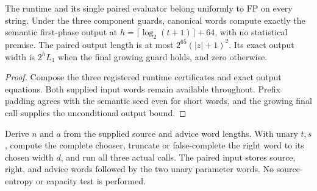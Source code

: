 \begin{theorem}
  \label{thm:lowerbounds-algebraic-affine-phase-one-program}
  \leanok
  The runtime and its single paired evaluator belong uniformly to
  $\mathrm{FP}$ on every string. Under the three component guards,
  canonical words compute exactly the semantic first-phase output at
  $h=\lceil\log_2(t+1)\rceil+64$, with no statistical premise.
  The paired output length is at most $2^{65}(|z|+1)^2$.
  Its exact output width is $2^hL_1$ when the final growing guard
  holds, and zero otherwise.
\end{theorem}
\begin{proof}
  \leanok
  Compose the three registered runtime certificates and exact output
  equations. Both supplied input words remain available throughout.
  Prefix padding agrees with the semantic seed even for short words,
  and the growing final call supplies the unconditional output bound.
\end{proof}

\begin{definition}
  \label{def:lowerbounds-algebraic-affine-phase-one-selected-program}
  \leanok
  Derive $n$ and $a$ from the supplied source and advice word lengths.
  With unary $t,s$, compute the complete chooser, truncate or
  false-complete the right word to its chosen width $d$, and run
  all three actual calls. The paired input stores source, right,
  and advice words followed by the two unary parameter words.
  No source-entropy or capacity test is performed.
\end{definition}

